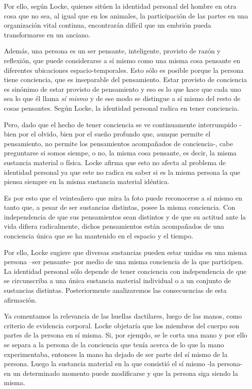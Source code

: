 \documentclass[main.tex]{subfiles}
\begin{document}
	Por ello, según Locke, quienes sitúen la identidad personal del hombre en otra cosa que no sea, al igual que en los animales, la participación de las partes en una organización vital continua, encontrarán difícil que un embrión pueda transformarse en un anciano.
	
	Además, una persona es un ser pensante, inteligente, provisto de razón y reflexión, que puede considerarse a sí mismo como una misma cosa pensante en diferentes ubicaciones espacio-temporales. Esto sólo es posible porque la persona tiene conciencia, que es inseparable del pensamiento. Estar provisto de conciencia es sinónimo de estar provisto de pensamiento y eso es lo que hace que cada uno sea lo que él llama \textit{sí mismo} y de ese modo se distingue a sí mismo del resto de cosas pensantes. Según Locke, la identidad personal radica en tener conciencia.
	
	
	Pero, dado que el hecho de tener conciencia se ve continuamente interrumpido -bien por el olvido, bien por el sueño profundo que, aunque permite el pensamiento, no permite los pensamientos acompañados de conciencia-, cabe preguntarse si somos siempe, o no, la misma cosa pensante, es decir, la misma sustancia material o física. Locke afirma que esto no afecta al problema de identidad personal ya que este no radica en saber si es la misma persona la que piensa siempre en la misma sustancia material idéntica.
	
	
	Es por esto que el veinteañero que mira la foto puede reconocerse a sí mismo en tanto que, a pesar de ser sustancias distintas, posee la misma conciencia. Con independencia de que sus pensamientos sean distintos y de que su actitud ante la vida difiera radicalmente, dichos pensamientos están acompañados de una conciencia única que se ha mantenido en el espacio y el tiempo.
	

	
	Por ello, Locke sugiere que diversas sustancias pueden estar unidas en una misma persona –ser pensante- por medio de una misma conciencia de la que participen. La identidad personal sólo depende de tener conciencia con independencia de que se circunscriba a una única sustancia material individual o a un conjunto de sustancias distintas. Posteriormente analizaremos las consecuencias de esta afirmación.
	
	
	Ya comentamos la relevancia de las huellas dactilares, luego de las manos, como criterio de evidencia corporal. Locke objetaría que los miembros del cuerpo son partes de la persona en sí misma. Si, por ejemplo, se le corta una mano y por ello se separa a la persona de la conciencia que tenía acerca de lo que la mano experimentaba, entonces la mano ha dejado de ser parte del sí mismo de la persona. Luego la sustancia material en la que consistió el sí mismo -la persona- en un determinado momento puede modificarse y que la persona siga siendo la misma.
	
\end{document}
